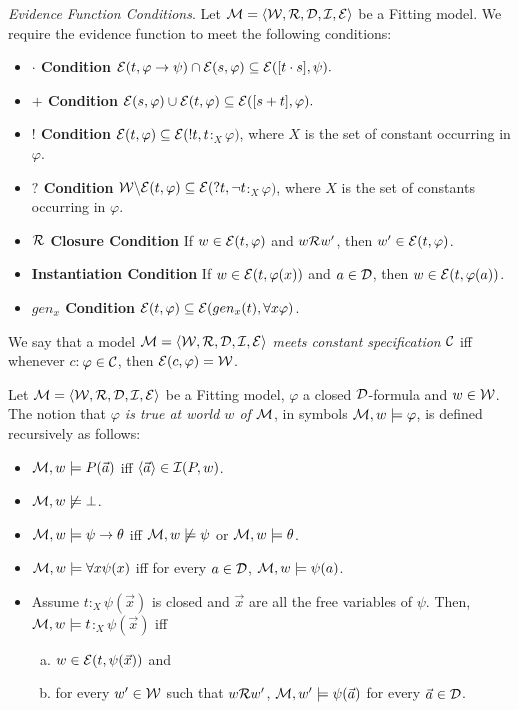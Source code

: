 \begin{defn}
	\textit{Evidence Function Conditions}. Let $\mathcal{M} = \langle\mathcal{W},\mathcal{R},\mathcal{D},\mathcal{I},\mathcal{E} \rangle$ be a Fitting model. We require the evidence function to meet the following conditions:
	
	
	\begin{itemize} 
		\item[] \textbf{$\cdot$ Condition} $\mathcal{E} (t, \varphi \rightarrow \psi) \cap \mathcal{E}(s, \varphi) \subseteq \mathcal{E}([t\cdot s], \psi).$
		\item[] \textbf{$+$ Condition} $\mathcal{E} (s, \varphi) \cup \mathcal{E}(t, \varphi) \subseteq \mathcal{E}([s+t], \varphi).$
		\item[] \textbf{$!$ Condition} $\mathcal{E} (t, \varphi) \subseteq \mathcal{E}(!t, t$$:_{X}\varphi)$, where $X$ is the set of constant occurring in $\varphi$.
		\item[] \textbf{$?$ Condition} $\mathcal{W}  \backslash \mathcal{E} (t, \varphi) \subseteq \mathcal{E}(?t,\neg t$$:_{X}\varphi)$, where $X$ is the set of constants occurring in $\varphi$.
		\item[] \textbf{$\mathcal{R}$ Closure Condition} If $w \in \mathcal{E} (t, \varphi)$ and $w \mathcal{R} w^{\prime}$, then $w^{\prime} \in \mathcal{E} (t, \varphi)$.
		\item[] \textbf{Instantiation Condition} If $w \in \mathcal{E} (t, \varphi(x))$ and $a \in \mathcal{D}$, then $w \in \mathcal{E} (t, \varphi(a))$.
		\item[] \textbf{$gen_{x}$ Condition} $\mathcal{E} (t, \varphi) \subseteq \mathcal{E}(gen_{x}(t),\forall x\varphi)$.
	\end{itemize}
\end{defn}

\qquad We say that a model $\mathcal{M} = \langle\mathcal{W},\mathcal{R},\mathcal{D},\mathcal{I},\mathcal{E} \rangle$ \textit{meets constant specification $\mathcal{C}$} iff whenever $c$$:$$\varphi \in \mathcal{C}$, then $\mathcal{E} (c, \varphi) = \mathcal{W}$.


\begin{defn}
	Let $\mathcal{M} = \langle\mathcal{W},\mathcal{R},\mathcal{D},\mathcal{I},\mathcal{E} \rangle$ be a Fitting model, $\varphi$ a closed $\mathcal{D}$-formula and $w \in \mathcal{W}$. The notion that \textit{$\varphi$ is true at world $w$ of $\mathcal{M}$}, in symbols $\mathcal{M},w \models \varphi$, is defined recursively as follows: 
	\begin{itemize} 
		\item $\mathcal{M},w \models P(\vec{a})$ iff $\langle \vec{a}\rangle \in \mathcal{I}(P,w)$. 
		\item $\mathcal{M},w \not\models \bot$. 
		\item $\mathcal{M},w \models \psi \rightarrow \theta$ iff $\mathcal{M},w \not\models \psi$ or $\mathcal{M},w \models \theta$.
		\item $\mathcal{M},w \models \forall x \psi(x)$ iff for every $a \in \mathcal{D}$, $\mathcal{M},w \models \psi(a)$.        
		\item Assume $t$$:_{X}$$\psi(\vec{x})$ is closed and $\vec{x}$ are all the free variables of $\psi$. Then, $\mathcal{M},w \models t$$:_{X}$$\psi(\vec{x})$ iff
		\begin{enumerate}[(a)]
			\item $w \in \mathcal{E} (t, \psi(\vec{x}))$ and
			\item for every $w^{\prime} \in \mathcal{W}$ such that $w\mathcal{R} w^{\prime}$, $\mathcal{M},w^{\prime} \models \psi(\vec{a})$ for every $\vec{a} \in \mathcal{D}$.
		\end{enumerate}
		
	\end{itemize}
	
\end{defn}



